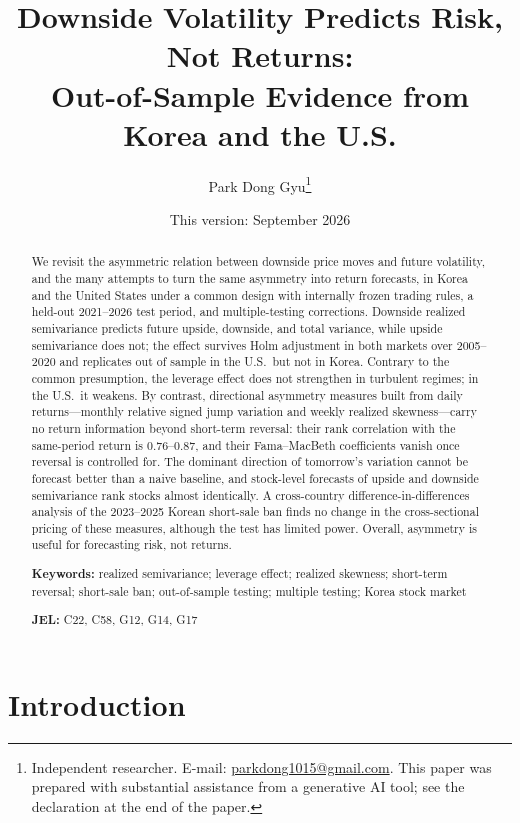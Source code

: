\documentclass[11pt]{article}
\title{Downside Volatility Predicts Risk, Not Returns:\\ Out-of-Sample Evidence from Korea and the U.S.}
\author{Park Dong Gyu\thanks{Independent researcher. E-mail: \href{mailto:parkdong1015@gmail.com}{parkdong1015@gmail.com}. This paper was prepared with substantial assistance from a generative AI tool; see the declaration at the end of the paper.}}
\date{This version: September 2026}
\begin{document}
\maketitle

\begin{abstract}
\noindent
We revisit the asymmetric relation between downside price moves and future volatility, and the many attempts to turn the same asymmetry into return forecasts, in Korea and the United States under a common design with internally frozen trading rules, a held-out 2021--2026 test period, and multiple-testing corrections. Downside realized semivariance predicts future upside, downside, and total variance, while upside semivariance does not; the effect survives Holm adjustment in both markets over 2005--2020 and replicates out of sample in the U.S.\ but not in Korea. Contrary to the common presumption, the leverage effect does not strengthen in turbulent regimes; in the U.S.\ it weakens. By contrast, directional asymmetry measures built from daily returns---monthly relative signed jump variation and weekly realized skewness---carry no return information beyond short-term reversal: their rank correlation with the same-period return is 0.76--0.87, and their Fama--MacBeth coefficients vanish once reversal is controlled for. The dominant direction of tomorrow's variation cannot be forecast better than a naive baseline, and stock-level forecasts of upside and downside semivariance rank stocks almost identically. A cross-country difference-in-differences analysis of the 2023--2025 Korean short-sale ban finds no change in the cross-sectional pricing of these measures, although the test has limited power. Overall, asymmetry is useful for forecasting risk, not returns.

\bigskip
\noindent\textbf{Keywords:} realized semivariance; leverage effect; realized skewness; short-term reversal; short-sale ban; out-of-sample testing; multiple testing; Korea stock market

\noindent\textbf{JEL:} C22, C58, G12, G14, G17
\end{abstract}

\newpage

\section{Introduction}
\end{document}
